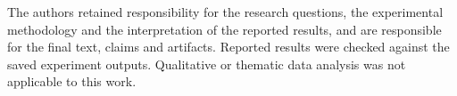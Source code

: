 \documentclass[10pt,twocolumn,letterpaper]{article}
\theoremstyle{definition}
\theoremstyle{remark}
\begin{document}
The authors retained responsibility for the research questions, the experimental methodology and the interpretation of the reported results, and are responsible for the final text, claims and artifacts.
Reported results were checked against the saved experiment outputs.
Qualitative or thematic data analysis was not applicable to this work.

{
  \small
  
  
}
\end{document}
